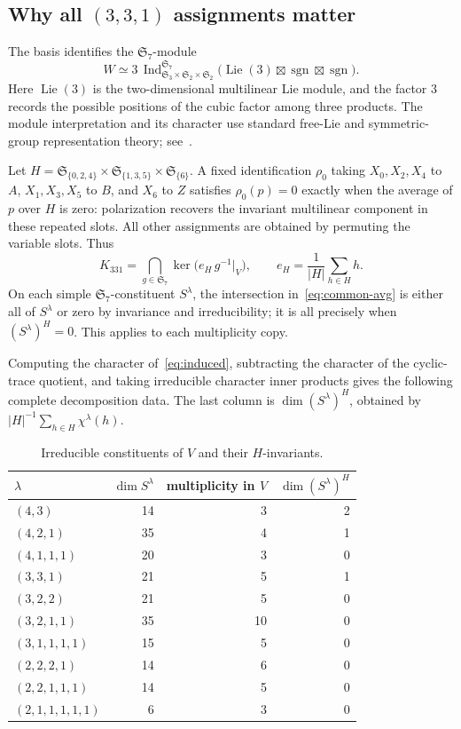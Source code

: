\documentclass[11pt,reqno]{amsart}
\theoremstyle{definition}
\newcommand{\Sym}{\mathfrak{S}}
\begin{document}
\subsection{Why all \texorpdfstring{$(3,3,1)$}{(3,3,1)} assignments matter}
The basis identifies the $\Sym_7$-module
\begin{equation}\label{eq:induced}
 W\simeq 3\,\operatorname{Ind}_{\Sym_3\times\Sym_2\times\Sym_2}^{\Sym_7}
 \bigl(\operatorname{Lie}(3)\boxtimes\operatorname{sgn}\boxtimes\operatorname{sgn}\bigr).
\end{equation}
Here $\operatorname{Lie}(3)$ is the two-dimensional multilinear Lie module, and the factor $3$ records the possible positions of the cubic factor among three products.  The module interpretation and its character use standard free-Lie and symmetric-group representation theory; see~\cite{Reutenauer1993}.

Let $H=\Sym_{\{0,2,4\}}\times\Sym_{\{1,3,5\}}\times\Sym_{\{6\}}$.  A fixed identification $\rho_0$ taking $X_0,X_2,X_4$ to $A$, $X_1,X_3,X_5$ to $B$, and $X_6$ to $Z$ satisfies $\rho_0(p)=0$ exactly when the average of $p$ over $H$ is zero: polarization recovers the invariant multilinear component in these repeated slots.  All other assignments are obtained by permuting the variable slots.  Thus
\begin{equation}\label{eq:common-avg}
 K_{331}=\bigcap_{g\in\Sym_7}\ker\bigl(e_H\,g^{-1}\vert_V\bigr),
 \qquad e_H=\frac{1}{|H|}\sum_{h\in H}h.
\end{equation}
On each simple $\Sym_7$-constituent $S^\lambda$, the intersection in~\eqref{eq:common-avg} is either all of $S^\lambda$ or zero by invariance and irreducibility; it is all precisely when $(S^\lambda)^H=0$.  This applies to each multiplicity copy.

Computing the character of~\eqref{eq:induced}, subtracting the character of the cyclic-trace quotient, and taking irreducible character inner products gives the following complete decomposition data.  The last column is $\dim(S^\lambda)^H$, obtained by $|H|^{-1}\sum_{h\in H}\chi^\lambda(h)$.
\begin{table}[ht]
\centering
\caption{Irreducible constituents of $V$ and their $H$-invariants.}\label{tab:irreps}
\small
\begin{tabular}{@{}lrrr@{}}
\toprule
$\lambda$ & $\dim S^\lambda$ & multiplicity in $V$ & $\dim(S^\lambda)^H$\\
\midrule
$(4,3)$&14&3&2\\
$(4,2,1)$&35&4&1\\
$(4,1,1,1)$&20&3&0\\
$(3,3,1)$&21&5&1\\
$(3,2,2)$&21&5&0\\
$(3,2,1,1)$&35&10&0\\
$(3,1,1,1,1)$&15&5&0\\
$(2,2,2,1)$&14&6&0\\
$(2,2,1,1,1)$&14&5&0\\
$(2,1,1,1,1,1)$&6&3&0\\
\bottomrule
\end{tabular}
\end{table}
\end{document}
